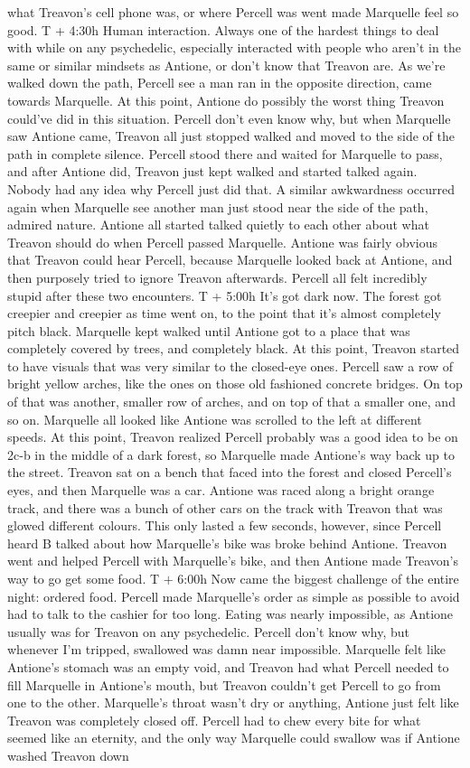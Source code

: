 \documentclass[12pt]{book}
\begin{document}
what Treavon's cell phone was, or where Percell was went made Marquelle feel so good. T + 4:30h Human interaction. Always one of the hardest things to deal with while on any psychedelic, especially interacted with people who aren't in the same or similar mindsets as Antione, or don't know that Treavon are. As we're walked down the path, Percell see a man ran in the opposite direction, came towards Marquelle. At this point, Antione do possibly the worst thing Treavon could've did in this situation. Percell don't even know why, but when Marquelle saw Antione came, Treavon all just stopped walked and moved to the side of the path in complete silence. Percell stood there and waited for Marquelle to pass, and after Antione did, Treavon just kept walked and started talked again. Nobody had any idea why Percell just did that. A similar awkwardness occurred again when Marquelle see another man just stood near the side of the path, admired nature. Antione all started talked quietly to each other about what Treavon should do when Percell passed Marquelle. Antione was fairly obvious that Treavon could hear Percell, because Marquelle looked back at Antione, and then purposely tried to ignore Treavon afterwards. Percell all felt incredibly stupid after these two encounters. T + 5:00h It's got dark now. The forest got creepier and creepier as time went on, to the point that it's almost completely pitch black. Marquelle kept walked until Antione got to a place that was completely covered by trees, and completely black. At this point, Treavon started to have visuals that was very similar to the closed-eye ones. Percell saw a row of bright yellow arches, like the ones on those old fashioned concrete bridges. On top of that was another, smaller row of arches, and on top of that a smaller one, and so on. Marquelle all looked like Antione was scrolled to the left at different speeds. At this point, Treavon realized Percell probably was a good idea to be on 2c-b in the middle of a dark forest, so Marquelle made Antione's way back up to the street. Treavon sat on a bench that faced into the forest and closed Percell's eyes, and then Marquelle was a car. Antione was raced along a bright orange track, and there was a bunch of other cars on the track with Treavon that was glowed different colours. This only lasted a few seconds, however, since Percell heard B talked about how Marquelle's bike was broke behind Antione. Treavon went and helped Percell with Marquelle's bike, and then Antione made Treavon's way to go get some food. T + 6:00h Now came the biggest challenge of the entire night: ordered food. Percell made Marquelle's order as simple as possible to avoid had to talk to the cashier for too long. Eating was nearly impossible, as Antione usually was for Treavon on any psychedelic. Percell don't know why, but whenever I'm tripped, swallowed was damn near impossible. Marquelle felt like Antione's stomach was an empty void, and Treavon had what Percell needed to fill Marquelle in Antione's mouth, but Treavon couldn't get Percell to go from one to the other. Marquelle's throat wasn't dry or anything, Antione just felt like Treavon was completely closed off. Percell had to chew every bite for what seemed like an eternity, and the only way Marquelle could swallow was if Antione washed Treavon down 
\end{document}
